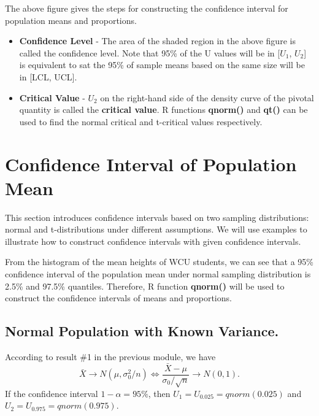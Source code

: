 \documentclass[
]{book}
\begin{document}
The above figure gives the steps for constructing the confidence interval for population means and proportions.

\begin{itemize}
\item
  \textbf{Confidence Level} - The area of the shaded region in the above figure is called the confidence level. Note that 95\% of the U values will be in {[}\(U_1\), \(U_2\){]} is equivalent to sat the 95\% of sample means based on the same size will be in {[}LCL, UCL{]}.
\item
  \textbf{Critical Value} - \(U_2\) on the right-hand side of the density curve of the pivotal quantity is called the \textbf{critical value}. R functions \textbf{qnorm()} and \textbf{qt()} can be used to find the normal critical and t-critical values respectively.
\end{itemize}

\hypertarget{confidence-interval-of-population-mean}{%
\section{Confidence Interval of Population Mean}\label{confidence-interval-of-population-mean}}

This section introduces confidence intervals based on two sampling distributions: normal and t-distributions under different assumptions. We will use examples to illustrate how to construct confidence intervals with given confidence intervals.

{From the histogram of the mean heights of WCU students, we can see that a 95\% confidence interval of the population mean under normal sampling distribution is 2.5\% and 97.5\% quantiles. Therefore, R function \textbf{qnorm()} will be used to construct the confidence intervals of means and proportions. }

\hypertarget{normal-population-with-known-variance.}{%
\subsection{Normal Population with Known Variance.}\label{normal-population-with-known-variance.}}

According to result \#1 in the previous module, we have
\[
\bar{X} \to N(\mu, \sigma_0^2/n) \Longleftrightarrow \frac{\bar{X} -\mu}{\sigma_0/\sqrt{n}} \to N(0, 1).
\]
If the confidence interval \(1-\alpha = 95\%\), then \(U_1 = U_{0.025} = qnorm(0.025)\) and \(U_2 = U_{0.975} = qnorm(0.975)\).
\end{document}
